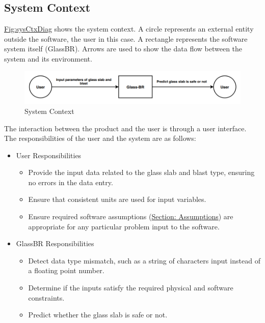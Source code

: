 \documentclass[12pt]{article}
\begin{document}
\subsection{System Context}
\label{Sec:SysContext}
\hyperref[Figure:sysCtxDiag]{Fig:sysCtxDiag} shows the system context. A circle represents an external entity outside the software, the user in this case. A rectangle represents the software system itself (GlassBR). Arrows are used to show the data flow between the system and its environment.

\begin{figure}
\begin{center}
\includegraphics[width=\textwidth]{../../../datafiles/GlassBR/SystemContextFigure.png}
\caption{System Context}
\label{Figure:sysCtxDiag}
\end{center}
\end{figure}
The interaction between the product and the user is through a user interface. The responsibilities of the user and the system are as follows:

\begin{itemize}
\item{User Responsibilities}
\begin{itemize}
\item{Provide the input data related to the glass slab and blast type, ensuring no errors in the data entry.}
\item{Ensure that consistent units are used for input variables.}
\item{Ensure required software assumptions (\hyperref[Sec:Assumps]{Section: Assumptions}) are appropriate for any particular problem input to the software.}
\end{itemize}
\item{GlassBR Responsibilities}
\begin{itemize}
\item{Detect data type mismatch, such as a string of characters input instead of a floating point number.}
\item{Determine if the inputs satisfy the required physical and software constraints.}
\item{Predict whether the glass slab is safe or not.}
\end{itemize}
\end{itemize}
\end{document}
